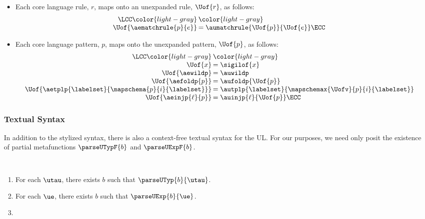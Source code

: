 \begin{grayparbox}
\begin{itemize}
\item Each core language rule, $r$, maps onto an unexpanded rule, $\Uof{r}$, as follows:
\[\arraycolsep=1pt\begin{array}{rl}
\LCC \color{light-gray} & \color{light-gray} \\
\Uof{\aematchrule{p}{e}} & = \aumatchrule{\Uof{p}}{\Uof{e}}\ECC
\end{array}\]
\item Each core language pattern, $p$, maps onto the unexpanded pattern, $\Uof{p}$, as follows:
\[\arraycolsep=1pt\begin{array}{rl}
\LCC \color{light-gray} & \color{light-gray} \\
\Uof{x} & = \sigilof{x}\\
\Uof{\aewildp} &= \auwildp\\
\Uof{\aefoldp{p}} &= \aufoldp{\Uof{p}}\\
\Uof{\aetplp{\labelset}{\mapschema{p}{i}{\labelset}}} & = \autplp{\labelset}{\mapschemax{\Uofv}{p}{i}{\labelset}}\\
\Uof{\aeinjp{\ell}{p}} & = \auinjp{\ell}{\Uof{p}}\ECC
\end{array}\]
\end{itemize}
\end{grayparbox}
\vspace{-10px}
\subsubsection{Textual Syntax}\vspace{-3px} In addition to the stylized syntax, there is also a context-free textual syntax for the UL. For our purposes, we need only posit the existence of partial metafunctions $\parseUTypF{b}$ and $\parseUExpF{b}$. 

\begin{condition}\label{condition:textual-representability-SES} ~
\begin{enumerate}
\item For each $\utau$, there exists $b$ such that $\parseUTyp{b}{\utau}$. 
\item For each $\ue$, there exists $b$ such that $\parseUExp{b}{\ue}$.
\item {}
\end{enumerate}
\end{condition}

